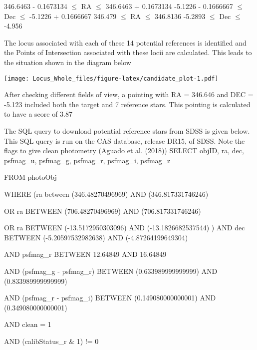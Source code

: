 \documentclass[]{elsarticle} %
\makeatletter
\def\maxwidth{\ifdim\Gin@nat@width>\linewidth\linewidth
\else\Gin@nat@width\fi}
\let\Oldincludegraphics\includegraphics
\renewcommand{\includegraphics}[1]{\Oldincludegraphics[width=\maxwidth]{#1}}
\makeatother
\begin{document}
346.6463 - 0.1673134 \(\leq\) RA \(\leq\) 346.6463 + 0.1673134
\vskip 0.2in -5.1226 - 0.1666667 \(\leq\) Dec \(\leq\) -5.1226 +
0.1666667 \vskip 0.2in 346.479 \(\leq\) RA \(\leq\) 346.8136
\vskip 0.2in -5.2893 \(\leq\) Dec \(\leq\) -4.956 \newpage

The locus associated with each of these 14 potential references is
identified and the Points of Intersection associated with these locii
are calculated. This leads to the situation shown in the diagram below

\texttt{[image: Locus\_Whole\_files/figure-latex/candidate\_plot-1.pdf]}

After checking different fields of view, a pointing with RA = 346.646
and DEC = -5.123 included both the target and 7 reference stars. This
pointing is calculated to have a score of 3.87 \newpage

The SQL query to download potential reference stars from SDSS is given
below. This SQL query is run on the CAS database, release DR15, of SDSS.
Note the flags to give clean photometry (Aguado et al. (2018))
\vskip 0.2in \noindent SELECT objID, ra, dec, psfmag\_u, psfmag\_g,
psfmag\_r, psfmag\_i, psfmag\_z

FROM photoObj

WHERE (ra between (346.48270496969) AND (346.817331746246)

OR ra BETWEEN (706.48270496969) AND (706.817331746246)

OR ra BETWEEN (-13.5172950303096) AND (-13.1826682537544) ) AND dec
BETWEEN (-5.20597532982638) AND (-4.87264199649304)

AND psfmag\_r BETWEEN 12.64849 AND 16.64849

AND (psfmag\_g - psfmag\_r) BETWEEN (0.633989999999999) AND
(0.833989999999999)

AND (psfmag\_r - psfmag\_i) BETWEEN (0.149080000000001) AND
(0.349080000000001)

AND clean = 1

AND (calibStatus\_r \& 1) != 0 \vskip 0.2in
\end{document}
